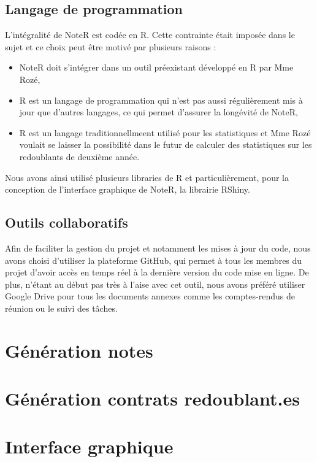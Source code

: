 \documentclass[a4paper,11pt]{article}
\begin{document}
\subsection{Langage de programmation }
    L'intégralité de NoteR est codée en R. Cette contrainte était imposée dans le sujet et ce choix peut être motivé par plusieurs raisons :
        \begin{itemize}
            \item NoteR doit s'intégrer dans un outil préexistant développé en R par Mme Rozé,
            \item R est un langage de programmation qui n'est pas aussi régulièrement mis à jour que d'autres langages, ce qui permet d'assurer la longévité de NoteR,
            \item  R est un langage traditionnellmeent utilisé pour les statistiques et Mme Rozé voulait se laisser la possibilité dans le futur de calculer des statistiques sur les redoublants de deuxième année.
        \end{itemize}
        Nous avons ainsi utilisé plusieurs libraries de R et particulièrement, pour la conception de l'interface graphique de NoteR, la librairie RShiny.
\subsection{Outils collaboratifs }
    Afin de faciliter la gestion du projet et notamment les mises à jour du code, nous avons choisi d'utiliser la plateforme GitHub, qui permet à tous les membres du projet d'avoir accès en temps réel à la dernière version du code mise en ligne. De plus, n'étant au début pas très à l'aise avec cet outil, nous avons préféré utiliser Google Drive pour tous les documents annexes comme les comptes-rendus de réunion ou le suivi des tâches.
  
\section{Génération notes }	

\section{Génération contrats redoublant.es}
  

\section{Interface graphique }	
\end{document}
